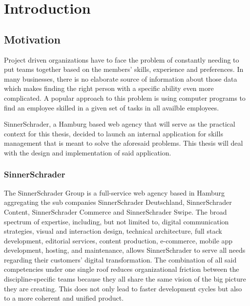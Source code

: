 \chapter{Introduction}

\section{Motivation}
Project driven organizations have to face the problem of constantly needing to put teams together based on the members’ skills, experience and preferences.
In many businesses, there is no elaborate source of information about those data which makes finding the right person with a specific ability even more complicated. A popular approach to this problem is using computer programs to find an employee skilled in a given set of tasks in all availble employees.

SinnerSchrader, a Hamburg based web agency that will serve as the practical context for this thesis, decided to launch an internal application for skills management that is meant to solve the aforesaid problems. This thesis will deal with the design and implementation of said application.



\subsection{SinnerSchrader}

The SinnerSchrader Group is a full-service web agency based in Hamburg aggregating the sub companies SinnerSchrader Deutschland, SinnerSchrader Content, SinnerSchrader Commerce and SinnerSchrader Swipe. The broad spectrum of expertise, including, but not limited to, digital communication strategies, visual and interaction design,  technical architecture, full stack development, editorial services, content production, e-commerce, mobile app development, hosting, and maintenance, allows SinnerSchrader to serve all needs regarding their customers' digital transformation. The combination of all said competencies under one single roof reduces organizational friction between the discipline-specific teams because they all share the same vision of the big picture they are creating. This does not only lead to faster development cycles but also to a more coherent and unified product.

